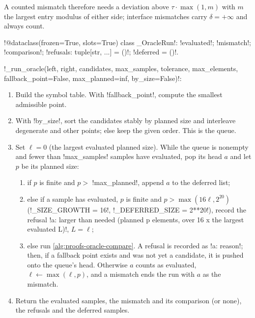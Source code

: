 A counted mismatch therefore needs a deviation above $\tau\cdot\max(1,m)$ with $m$ the largest entry modulus of either side; interface mismatches carry $\delta=+\infty$ and always count.

\begin{signature}
\py!@dataclass(frozen=True, slots=True) class _OracleRun!: \py!evaluated!; \py!mismatch!; \py!comparison!; \py!refusals: tuple[str, ...] = ()!; \py!deferred = ()!.
\end{signature}

\begin{algorithm}\label{alg:proofs-run-oracle}
\py!_run_oracle(left, right, candidates, max_samples, tolerance, max_elements, fallback_point=False, max_planned=inf, by_size=False)!:
\begin{enumerate}
\item Build the symbol table. With \py!fallback_point!, compute the smallest admissible point.
\item With \py!by_size!, sort the candidates stably by planned size and interleave degenerate and other points; else keep the given order. This is the queue.
\item Set $\ell=0$ (the largest evaluated planned size). While the queue is nonempty and fewer than \py!max_samples! samples have evaluated, pop its head $a$ and let $p$ be its planned size:
  \begin{enumerate}
  \item if $p$ is finite and $p>$ \py!max_planned!, append $a$ to the deferred list;
  \item else if a sample has evaluated, $p$ is finite and $p>\max(16\ell,2^{20})$ (\py!_SIZE_GROWTH = 16!, \py!_DEFERRED_SIZE = 2**20!), record the refusal \code!{a}: larger than needed (planned p elements, over 16 x the largest evaluated L)!, $L=\ell$;
  \item else run \cref{alg:proofs-oracle-compare}. A refusal is recorded as \code!{a}: reason!; then, if a fallback point exists and was not yet a candidate, it is pushed onto the queue's head. Otherwise $a$ counts as evaluated, $\ell\leftarrow\max(\ell,p)$, and a mismatch ends the run with $a$ as the mismatch.
  \end{enumerate}
\item Return the evaluated samples, the mismatch and its comparison (or none), the refusals and the deferred samples.
\end{enumerate}
\end{algorithm}

